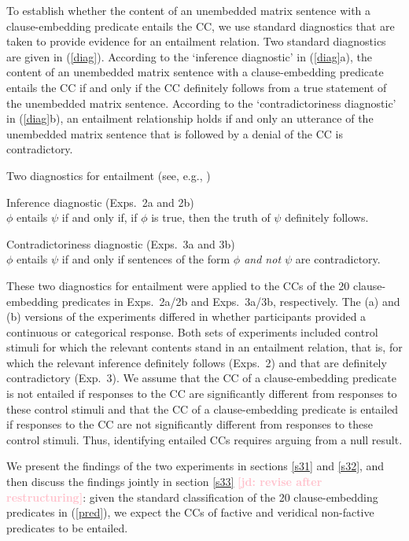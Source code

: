 \documentclass[11pt,fleqn]{article}
\newcommand{\jd}[1]{\textbf{\textcolor{Pink}{[jd: #1]}}}
\newcommand{\6}{\mbox{$[\hspace*{-.6mm}[$}}
\newcommand{\9}{\mbox{$]\hspace*{-.6mm}]$}}
\begin{document}
To establish whether the content of an unembedded matrix sentence with a clause-embedding predicate entails the CC, we use standard diagnostics that are taken to provide evidence for an entailment relation. Two standard diagnostics are given in (\ref{diag}). According to the `inference diagnostic' in (\ref{diag}a), the content of an unembedded matrix sentence with a clause-embedding predicate entails the CC if and only if the CC definitely follows from a true statement of the unembedded matrix sentence. According to the `contradictoriness diagnostic' in (\ref{diag}b), an entailment relationship holds if and only an utterance of the unembedded matrix sentence that is followed by a denial of the CC is contradictory. 

\begin{exe}
\ex\label{diag} Two diagnostics for entailment \hfill (see, e.g., \citealt[\S3.1]{ccmg90})
\begin{xlist}
\ex  Inference diagnostic (Exps.~2a and 2b)\\ $\phi$ entails $\psi$ if and only if, if $\phi$ is true, then the truth of $\psi$ definitely follows. 

\ex  Contradictoriness diagnostic  (Exps.~3a and 3b)\\ $\phi$ entails $\psi$ if and only if sentences of the form {\em $\phi$ and not $\psi$} are contradictory. 

\end{xlist}
\end{exe}
These two diagnostics for entailment were applied to the CCs of the 20 clause-embedding predicates in Exps.~2a/2b and Exps.~3a/3b, respectively. The (a) and (b) versions of the experiments differed in whether participants provided a continuous or categorical response.  Both sets of experiments included control stimuli for which the relevant contents stand in an entailment relation, that is, for which the relevant inference definitely follows (Exps.~2) and that are definitely contradictory (Exp.~3). We assume that the CC of a clause-embedding predicate is not entailed if responses to the CC are significantly different from responses to these control stimuli and that the CC of a clause-embedding predicate is entailed if responses to the CC are not significantly different from responses to these control stimuli. Thus, identifying entailed CCs  requires arguing from a null result. 

We present the findings of the two experiments in sections \ref{s31} and \ref{s32}, and then discuss the findings jointly in section \ref{s33} \jd{revise after restructuring}: given the standard classification of the 20 clause-embedding predicates in (\ref{pred}), we expect the CCs of factive and veridical non-factive predicates to be entailed.
\end{document}
